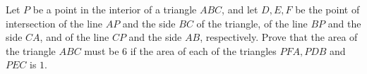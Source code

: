 Let $ P $ be a point in the interior of a triangle $ ABC $, and let $ D, E, F $ be the point of intersection of the line $ AP $ and the side $ BC $ of the triangle, of the line $ BP $ and the side $ CA $, and of the line $ CP $ and the side $ AB $, respectively. Prove that the area of the triangle $ ABC $ must be $ 6  $ if the area of each of the triangles $ PFA, PDB $ and $ PEC $ is $ 1 $.
